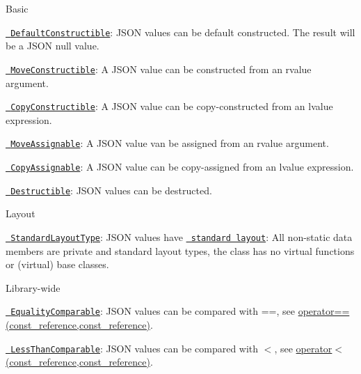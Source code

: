 \begin{DoxyItemize}
\item Basic
\begin{DoxyItemize}
\item \href{http://en.cppreference.com/w/cpp/concept/DefaultConstructible}{\texttt{ Default\+Constructible}}\+: J\+S\+ON values can be default constructed. The result will be a J\+S\+ON null value.
\item \href{http://en.cppreference.com/w/cpp/concept/MoveConstructible}{\texttt{ Move\+Constructible}}\+: A J\+S\+ON value can be constructed from an rvalue argument.
\item \href{http://en.cppreference.com/w/cpp/concept/CopyConstructible}{\texttt{ Copy\+Constructible}}\+: A J\+S\+ON value can be copy-\/constructed from an lvalue expression.
\item \href{http://en.cppreference.com/w/cpp/concept/MoveAssignable}{\texttt{ Move\+Assignable}}\+: A J\+S\+ON value van be assigned from an rvalue argument.
\item \href{http://en.cppreference.com/w/cpp/concept/CopyAssignable}{\texttt{ Copy\+Assignable}}\+: A J\+S\+ON value can be copy-\/assigned from an lvalue expression.
\item \href{http://en.cppreference.com/w/cpp/concept/Destructible}{\texttt{ Destructible}}\+: J\+S\+ON values can be destructed.
\end{DoxyItemize}
\item Layout
\begin{DoxyItemize}
\item \href{http://en.cppreference.com/w/cpp/concept/StandardLayoutType}{\texttt{ Standard\+Layout\+Type}}\+: J\+S\+ON values have \href{http://en.cppreference.com/w/cpp/language/data_members\#Standard_layout}{\texttt{ standard layout}}\+: All non-\/static data members are private and standard layout types, the class has no virtual functions or (virtual) base classes.
\end{DoxyItemize}
\item Library-\/wide
\begin{DoxyItemize}
\item \href{http://en.cppreference.com/w/cpp/concept/EqualityComparable}{\texttt{ Equality\+Comparable}}\+: J\+S\+ON values can be compared with {\ttfamily ==}, see \mbox{\hyperlink{classnlohmann_1_1basic__json_a122640e7e2db1814fc7bbb3c122ec76e}{operator==(const\+\_\+reference,const\+\_\+reference)}}.
\item \href{http://en.cppreference.com/w/cpp/concept/LessThanComparable}{\texttt{ Less\+Than\+Comparable}}\+: J\+S\+ON values can be compared with {\ttfamily $<$}, see \mbox{\hyperlink{classnlohmann_1_1basic__json_aacd442b66140c764c594ac8ad7dfd5b3}{operator$<$(const\+\_\+reference,const\+\_\+reference)}}.

\end{DoxyItemize}
\end{DoxyItemize}
